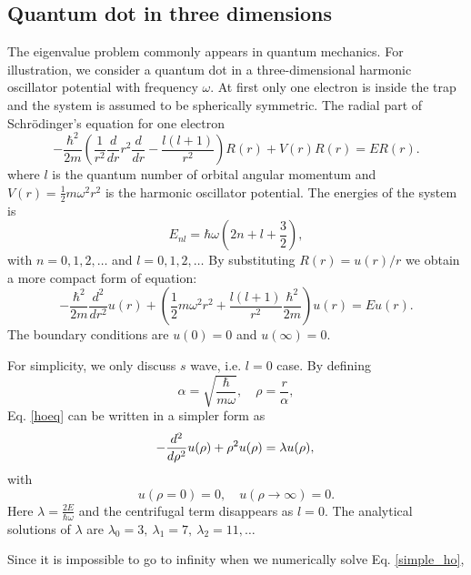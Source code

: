 \documentclass{article}
\begin{document}
	\subsection{Quantum dot in three dimensions}
The eigenvalue problem commonly appears in quantum mechanics. 
For illustration, we consider a quantum dot in a three-dimensional harmonic oscillator potential with frequency $\omega$. 
At first only one electron is inside the trap and the system is assumed to be spherically symmetric. 
The radial part of Schr\"{o}dinger's equation for one electron 
\begin{equation}
-\frac{\hbar^2}{2 m} \left ( \frac{1}{r^2} \frac{d}{dr} r^2
\frac{d}{dr} - \frac{l (l + 1)}{r^2} \right )R(r) 
+ V(r) R(r) = E R(r).
\end{equation}
where $l$ is the quantum number of orbital angular momentum and $V(r)=\frac{1}{2}m\omega^2 r^2$ is the harmonic oscillator potential. 
The energies of the system is 
\begin{equation}
E_{nl}=  \hbar \omega \left(2n+l+\frac{3}{2}\right),
\end{equation}
with $n=0,1,2,\dots$ and $l=0,1,2,\dots$
By substituting $R(r) = u(r)/r$ we obtain a more compact form of equation: 
\begin{equation}\label{hoeq}
-\frac{\hbar^2}{2 m} \frac{d^2}{dr^2} u(r) 
+ \left ( \frac{1}{2}m\omega^2 r^2 + \frac{l (l + 1)}{r^2}\frac{\hbar^2}{2 m}
\right ) u(r)  = E u(r) .
\end{equation}
The boundary conditions are $u(0)=0$ and $u(\infty)=0$.
\par
For simplicity, we only discuss $s$ wave, i.e. $l=0$ case. 
By defining 
\begin{equation*}
\alpha=\sqrt{\frac{\hbar}{m\omega}},\quad \rho=\frac{r}{\alpha},
\end{equation*}
Eq. \ref{hoeq} can be written in a simpler form as
\begin{equation}\label{simple_ho}
  -\frac{d^2}{d\rho^2} u(\rho) + \rho^2u(\rho)  = \lambda u(\rho), \\
\end{equation}
with
\begin{equation*}
  u(\rho=0)=0,\quad u(\rho\rightarrow\infty)=0. 
\end{equation*} 
Here $\lambda=\frac{2E}{\hbar\omega}$ and the centrifugal term disappears as $l=0$. 
The analytical solutions of $\lambda$ are $\lambda_0=3,\ \lambda_1=7,\ \lambda_2=11,\dots$
\par
Since it is impossible to go to infinity when we numerically solve Eq. \ref{simple_ho}, 
\end{document}
